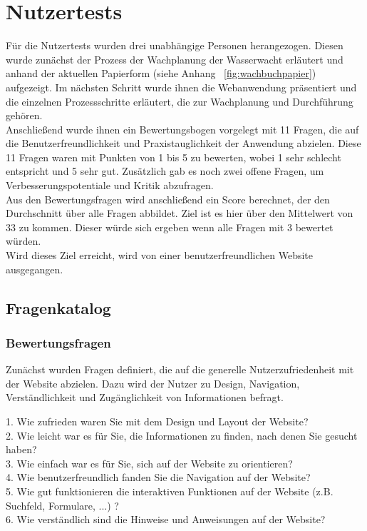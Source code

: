 \documentclass[fontsize=12pt,openright,oneside,paper=a4,BCOR=1cm]{scrbook}
\begin{document}
\section{Nutzertests}

Für die Nutzertests wurden drei unabhängige Personen herangezogen. Diesen wurde zunächst der Prozess der Wachplanung der Wasserwacht erläutert und anhand der aktuellen Papierform (siehe Anhang ~\ref{fig:wachbuchpapier}) aufgezeigt. Im nächsten Schritt wurde ihnen die Webanwendung präsentiert und die einzelnen Prozessschritte erläutert, die zur Wachplanung und Durchführung gehören. \\
Anschließend wurde ihnen ein Bewertungsbogen vorgelegt mit 11 Fragen, die auf die Benutzerfreundlichkeit und Praxistauglichkeit der Anwendung abzielen. Diese 11 Fragen waren mit Punkten von 1 bis 5 zu bewerten, wobei 1 sehr schlecht entspricht und 5 sehr gut. Zusätzlich gab es noch zwei offene Fragen, um Verbesserungspotentiale und Kritik abzufragen. \\
Aus den Bewertungsfragen wird anschließend ein Score berechnet, der den Durchschnitt über alle Fragen abbildet. Ziel ist es hier über den Mittelwert von 33 zu kommen. Dieser würde sich ergeben wenn alle Fragen mit 3 bewertet würden. \\
Wird dieses Ziel erreicht, wird von einer benutzerfreundlichen Website ausgegangen.

\subsection{Fragenkatalog}
\subsubsection{Bewertungsfragen}
Zunächst wurden Fragen definiert, die auf die generelle Nutzerzufriedenheit mit der Website abzielen. Dazu wird der Nutzer zu Design, Navigation, Verständlichkeit und Zugänglichkeit von Informationen befragt.

1. Wie zufrieden waren Sie mit dem Design und Layout der Website?\\
2. Wie leicht war es für Sie, die Informationen zu finden, nach denen Sie gesucht haben?\\
3. Wie einfach war es für Sie, sich auf der Website zu orientieren?\\
4. Wie benutzerfreundlich fanden Sie die Navigation auf der Website?\\
5. Wie gut funktionieren die interaktiven Funktionen auf der Website (z.B. Suchfeld, Formulare, ...) ?\\
6. Wie verständlich sind die Hinweise und Anweisungen auf der Website?
\end{document}
